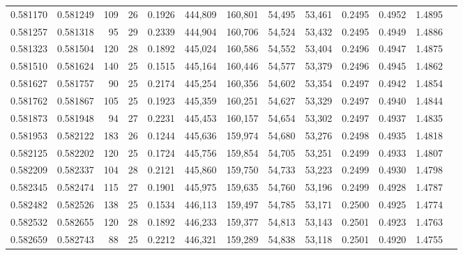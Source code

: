 \begin{tabular}{rrrrrrrrrrrrr}
0.581170 & 0.581249 &   109 &  26 &                                     0.1926 & 444,809 & 160,801 &  54,495 &  53,461 & 0.2495 & 0.4952 & 1.4895 \\
0.581257 & 0.581318 &    95 &  29 &                                     0.2339 & 444,904 & 160,706 &  54,524 &  53,432 & 0.2495 & 0.4949 & 1.4886 \\
0.581323 & 0.581504 &   120 &  28 &                                     0.1892 & 445,024 & 160,586 &  54,552 &  53,404 & 0.2496 & 0.4947 & 1.4875 \\
0.581510 & 0.581624 &   140 &  25 &                                     0.1515 & 445,164 & 160,446 &  54,577 &  53,379 & 0.2496 & 0.4945 & 1.4862 \\
0.581627 & 0.581757 &    90 &  25 &                                     0.2174 & 445,254 & 160,356 &  54,602 &  53,354 & 0.2497 & 0.4942 & 1.4854 \\
0.581762 & 0.581867 &   105 &  25 &                                     0.1923 & 445,359 & 160,251 &  54,627 &  53,329 & 0.2497 & 0.4940 & 1.4844 \\
0.581873 & 0.581948 &    94 &  27 &                                     0.2231 & 445,453 & 160,157 &  54,654 &  53,302 & 0.2497 & 0.4937 & 1.4835 \\
0.581953 & 0.582122 &   183 &  26 &                                     0.1244 & 445,636 & 159,974 &  54,680 &  53,276 & 0.2498 & 0.4935 & 1.4818 \\
0.582125 & 0.582202 &   120 &  25 &                                     0.1724 & 445,756 & 159,854 &  54,705 &  53,251 & 0.2499 & 0.4933 & 1.4807 \\
0.582209 & 0.582337 &   104 &  28 &                                     0.2121 & 445,860 & 159,750 &  54,733 &  53,223 & 0.2499 & 0.4930 & 1.4798 \\
0.582345 & 0.582474 &   115 &  27 &                                     0.1901 & 445,975 & 159,635 &  54,760 &  53,196 & 0.2499 & 0.4928 & 1.4787 \\
0.582482 & 0.582526 &   138 &  25 &                                     0.1534 & 446,113 & 159,497 &  54,785 &  53,171 & 0.2500 & 0.4925 & 1.4774 \\
0.582532 & 0.582655 &   120 &  28 &                                     0.1892 & 446,233 & 159,377 &  54,813 &  53,143 & 0.2501 & 0.4923 & 1.4763 \\
0.582659 & 0.582743 &    88 &  25 &                                     0.2212 & 446,321 & 159,289 &  54,838 &  53,118 & 0.2501 & 0.4920 & 1.4755 \\

\end{tabular}

